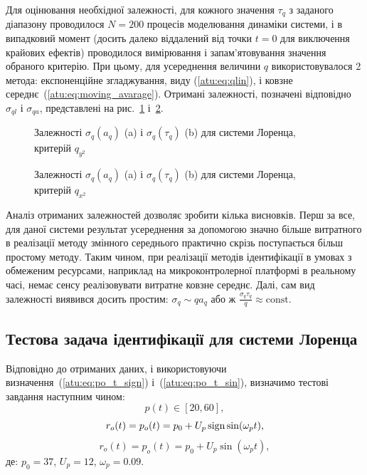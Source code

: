Для оцінювання необхідної залежності, для кожного значення
$\tau_q$ з заданого діапазону проводилося
$N=200$ процесів моделювання динаміки системи, і в випадковий
момент (досить далеко віддалений від точки
$t=0$ для виключення крайових ефектів) проводилося вимірювання
і запам'ятовування значення обраного критерію. При цьому, для усереднення
величини
$q$ використовувалося 2 метода: експоненційне згладжування,
виду (\ref{atu:eq:qlin}), і ковзне середнє~(\ref{atu:eq:moving_avarage}). Отримані
залежності, позначені відповідно
$\sigma_{ql}$ і
$\sigma_{qa}$, представлені на рис.~\ref{atu:f:lor_qy2_tau} і~\ref{atu:f:lor_qx2_tau}.


\begin{figure}[htb!]
  \caption{Залежності $ \sigma_{q} (a_q) $ (a) і $ \sigma_{q} (\tau_q) $ (b) для системи Лоренца, критерій $q_{y^2}$}
\label{atu:f:lor_qy2_tau}
\end{figure}


\begin{figure}[htb!]
  \caption{Залежності $ \sigma_{q} (a_q) $ (a) і $ \sigma_{q} (\tau_q) $ (b) для системи Лоренца, критерій $q_{x^2}$}
\label{atu:f:lor_qx2_tau}
\end{figure}

Аналіз отриманих залежностей дозволяє зробити кілька
висновків. Перш за все, для даної системи результат усереднення
за допомогою значно більше витратного в реалізації
методу змінного середнього практично скрізь поступається
більш простому методу. Таким чином, при реалізації методів
ідентифікації в умовах з обмеженим ресурсами, наприклад на
микроконтролерної платформі в реальному часі, немає сенсу
реалізовувати витратне ковзне середнє. Далі, сам вид
залежності виявився досить простим:
$\sigma_q \sim q a_q $ або ж
$\frac{\sigma_q \tau_q}{q} \approx \mathrm{const}$.



\subsection{Тестова задача ідентифікації для системи Лоренца}%

Відповідно до отриманих даних, і використовуючи
визначення~(\ref{atu:eq:po_t_sign}) і~(\ref{atu:eq:po_t_sin}),
%
визначимо тестові завдання наступним чином:
\[
  p(t) \in [20, 60],
\]
%
\begin{equation}
  r_o(t) = p_o(t) = p_0 +  U_{p} \operatorname*{sign} \sin( \omega_{p} t ),
  \label{atu:eq:lor_po_t_sign}
\end{equation}
%
%
\begin{equation}
  r_o(t) = p_o(t) = p_0 +  U_{p} \sin( \omega_{p} t ),
  \label{atu:eq:lor_po_t_sin}
\end{equation}
%
де:
$p_0 = 37$, $U_p=12$, $\omega_p=0.09$.

